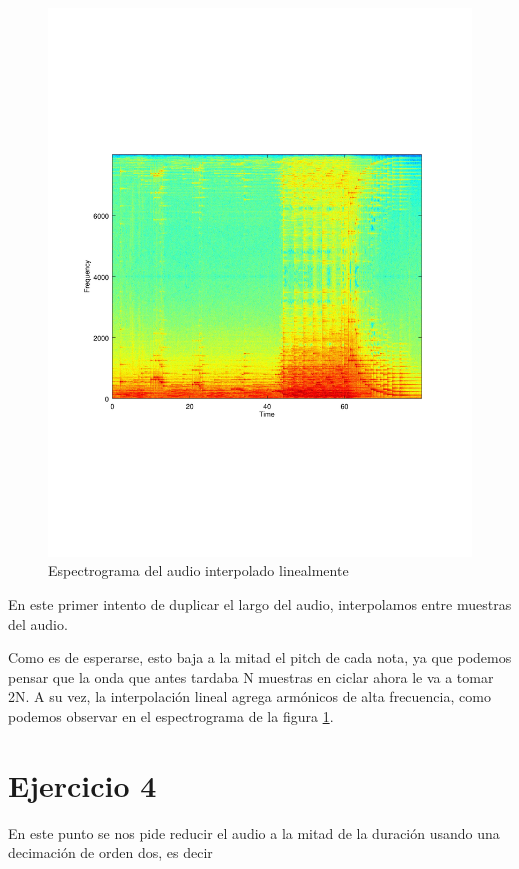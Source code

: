 \documentclass[paper=a4, fontsize=11pt]{scrartcl} %
\numberwithin{equation}{section} %
\numberwithin{figure}{section} %
\numberwithin{table}{section} %
\begin{document}
\begin{figure}[bh!]
\includegraphics[width=\textwidth]{../images/specgram_3_interpolated.pdf}
\caption{Espectrograma del audio interpolado linealmente}
\label{audio_interp_lineal}
\end{figure}

En este primer intento de duplicar el largo del audio, interpolamos entre muestras del audio.

Como es de esperarse, esto baja a la mitad el pitch de cada nota, ya que podemos pensar que la onda que antes tardaba N muestras en ciclar ahora le va a tomar 2N. A su vez, la interpolación lineal agrega armónicos de alta frecuencia, como podemos observar en el espectrograma de la figura \ref{audio_interp_lineal}.


\section{Ejercicio 4}

En este punto se nos pide reducir el audio a la mitad de la duración usando una decimación de orden dos, es decir
\end{document}
